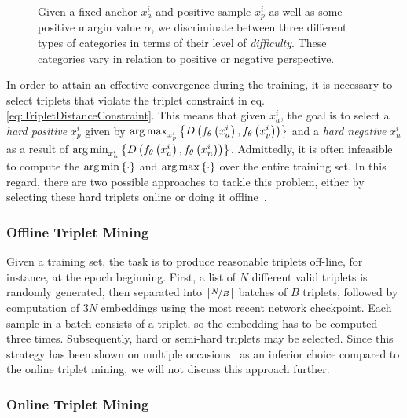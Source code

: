 \begin{figure}[t]
\begin{subfigure}[b]{0.35\textwidth}
        \caption[]{}
    \end{subfigure}
    \caption[Triplet loss categories visualization.]{Given a fixed anchor $x_a^i$ and positive sample $x_p^i$ as well as some positive margin value $\alpha$, we discriminate between three different types of categories in terms of their level of \emph{difficulty}. These categories vary in relation to positive  or negative  perspective.}
    \label{fig:PositiveAndNegativeTripletsCategories}
\end{figure}

In order to attain an effective convergence during the training, it is necessary to select triplets that violate the triplet constraint in eq. \ref{eq:TripletDistanceConstraint}. This means that given $x_a^i$, the goal is to select a \emph{hard positive} $x_p^i$ given by $\operatorname*{arg\,max}_{x_p^i}\left\{ {{D} \left( {f_\theta} \left( x_a^i \right), {f_\theta} \left( x_p^i \right) \right)} \right\}$ and a \emph{hard negative} $x_n^i$ as a result of $\operatorname*{arg\,min}_{x_n^i}\left\{ {{D} \left( {f_\theta} \left( x_a^i \right), {f_\theta} \left( x_n^i \right) \right)} \right\}$. Admittedly, it is often infeasible to compute the $\operatorname*{arg\,min}\left\{ {\cdot} \right\}$ and $\operatorname*{arg\,max}\left\{ {\cdot} \right\}$ over the entire training set. In this regard, there are two possible approaches to tackle this problem, either by selecting these hard triplets online or doing it offline~\cite{schroff2015facenet}.

\subsubsection{Offline Triplet Mining}

Given a training set, the task is to produce reasonable triplets off-line, for instance, at the epoch beginning. First, a list of $N$ different valid triplets is randomly generated, then separated into $\lfloor \nicefrac{N}{B} \rfloor$ batches of $B$ triplets, followed by computation of $3N$ embeddings using the most recent network checkpoint. Each sample in a batch consists of a triplet, so the embedding has to be computed three times. Subsequently, hard or semi-hard triplets may be selected. Since this strategy has been shown on multiple occasions~\cite{schroff2015facenet, hermans2017triplet, kuma2019vehiclereid} as an inferior choice compared to the online triplet mining, we will not discuss this approach further.

\subsubsection{Online Triplet Mining}

